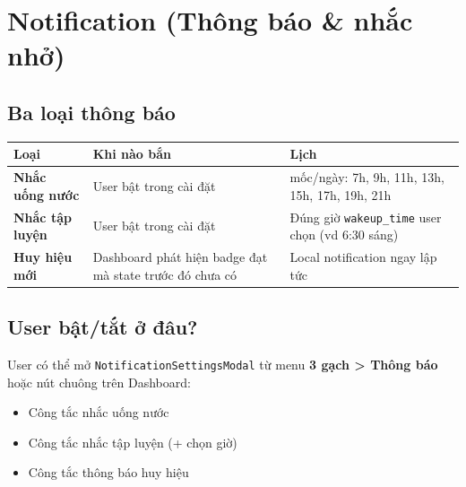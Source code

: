 \documentclass[12pt,a4paper]{article}
\newcounter{none}
\providecommand{\tightlist}{%
  \setlength{\itemsep}{0pt}\setlength{\parskip}{0pt}}
\begin{document}
\section{Notification (Thông báo \& nhắc
nhở)}\label{notification-thuxf4ng-buxe1o-nhux1eafc-nhux1edf}

\subsection{Ba loại thông báo}\label{ba-loux1ea1i-thuxf4ng-buxe1o}

{\def\LTcaptype{none} %
\begin{longtable}[]{@{}
  >{\raggedright\arraybackslash}p{}
  >{\raggedright\arraybackslash}p{}
  >{\raggedright\arraybackslash}p{}@{}}
\toprule\noalign{}
\begin{minipage}[b]{\linewidth}\raggedright
Loại
\end{minipage} & \begin{minipage}[b]{\linewidth}\raggedright
Khi nào bắn
\end{minipage} & \begin{minipage}[b]{\linewidth}\raggedright
Lịch
\end{minipage} \\
\midrule\noalign{}
\endhead
\bottomrule\noalign{}
\endlastfoot
\textbf{Nhắc uống nước} & User bật trong cài đặt & 8 mốc/ngày: 7h, 9h,
11h, 13h, 15h, 17h, 19h, 21h \\
\textbf{Nhắc tập luyện} & User bật trong cài đặt & Đúng giờ
\texttt{wakeup\_time} user chọn (vd 6:30 sáng) \\
\textbf{Huy hiệu mới} & Dashboard phát hiện badge đạt mà state trước đó
chưa có & Local notification ngay lập tức \\
\end{longtable}
}

\subsection{User bật/tắt ở
đâu?}\label{user-bux1eadttux1eaft-ux1edf-ux111uxe2u}

User có thể mở \texttt{NotificationSettingsModal} từ menu \textbf{3 gạch
\textgreater{} Thông báo} hoặc nút chuông trên Dashboard:

\begin{itemize}
\tightlist
\item
  Công tắc nhắc uống nước
\item
  Công tắc nhắc tập luyện (+ chọn giờ)
\item
  Công tắc thông báo huy hiệu
\end{itemize}
\end{document}
